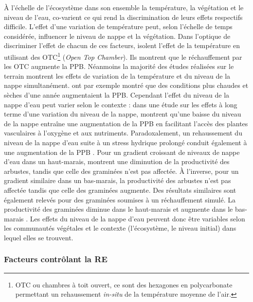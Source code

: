 À l'échelle de l'écosystème dans son ensemble la température, la végétation et le niveau de l'eau, co-varient ce qui rend la discrimination de leurs effets respectifs difficile.
L'effet d'une variation de température peut, selon l'échelle de temps considérée, influencer le niveau de nappe et la végétation.
Dans l'optique de discriminer l'effet de chacun de ces facteurs, \citet{munir2015} isolent l'effet de la température en utilisant des OTC\footnote{OTC ou chambres à toit ouvert, ce sont des hexagones en polycarbonate permettant un rehaussement \textit{in-situ} de la température moyenne de l'air.} (\textit{Open Top Chamber}).
Ils montrent que le réchauffement par les OTC augmente la PPB.
Néanmoins la majorité des études réalisées sur le terrain montrent les effets de variation de la température et du niveau de la nappe simultanément.
\citet{cai2010} ont par exemple montré que des conditions plus chaudes et sèches d'une année augmentaient la PPB.
Cependant l'effet du niveau de la nappe d'eau peut varier selon le contexte : dans une étude sur les effets à long terme d'une variation du niveau de la nappe, \citet{ballantyne2014} montrent qu'une baisse du niveau de la nappe entraîne une augmentation de la PPB en facilitant l'accès des plantes vasculaires à l'oxygène et aux nutriments.
Paradoxalement, un rehaussement du niveau de la nappe d'eau suite à un stress hydrique prolongé conduit également à une augmentation de la PPB \citep{strack2013}.
Pour un gradient croissant de niveaux de nappe d'eau dans un haut-marais, \citet{weltzin2000} montrent une diminution de la productivité des arbustes, tandis que celle des graminées n'est pas affectée.
À l'inverse, pour un gradient similaire dans un bas-marais, la productivité des arbustes n'est pas affectée tandis que celle des graminées augmente.
Des résultats similaires sont également relevés pour des graminées soumises à un réchauffement simulé.
La productivité des graminées diminue dans le haut-marais et augmente dans le bas-marais \citep{weltzin2000}.
Les effets du niveau de la nappe d'eau peuvent donc être variables selon les communautés végétales et le contexte (l'écosystème, le niveau initial) dans lequel elles se trouvent.

\subsubsection{Facteurs contrôlant la RE}

